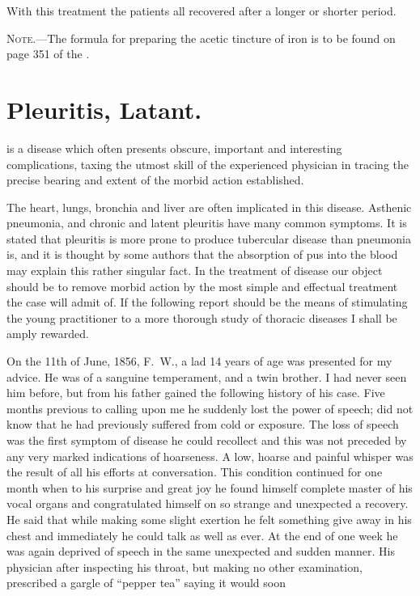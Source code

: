 
With this treatment the patients all recovered after a longer or shorter
period.

\textsc{Note.---}The formula for preparing the acetic tincture of iron is to be
found on page 351 of the .

\section*{Pleuritis, Latant.}


 is a disease which often presents obscure, important and interesting
complications, taxing the utmost skill of the experienced physician
in tracing the precise bearing and extent of the morbid action
established.

The heart, lungs, bronchia and liver are often implicated in this disease.
Asthenic pneumonia, and chronic and latent pleuritis have many common
symptoms. It is stated that pleuritis is more prone to produce
tubercular disease than pneumonia is, and it is thought by some authors
that the absorption of pus into the blood may explain this rather singular
fact. In the treatment of disease our object should be to remove
morbid action by the most simple and effectual treatment the case will
admit of. If the following report should be the means of stimulating
the young practitioner to a more thorough study of thoracic diseases I
shall be amply rewarded.

On the 11th of June, 1856, F.~W., a lad 14 years of age was presented
for my advice. He was of a sanguine temperament, and a twin brother.
I had never seen him before, but from his father gained the following
history of his case. Five months previous to calling upon me he suddenly
lost the power of speech; did not know that he had previously
suffered from cold or exposure. The loss of speech was the first symptom
of disease he could recollect and this was not preceded by any
very marked indications of hoarseness. A low, hoarse and painful
whisper was the result of all his efforts at conversation. This condition
continued for one month when to his surprise and great joy he found
himself complete master of his vocal organs and congratulated himself
on so strange and unexpected a recovery. He said that while making
some slight exertion he felt something give away in his chest and immediately
he could talk as well as ever. At the end of one week he
was again deprived of speech in the same unexpected and sudden manner.
His physician after inspecting his throat, but making no other
examination, prescribed a gargle of ``pepper tea'' saying it would soon\endinput
